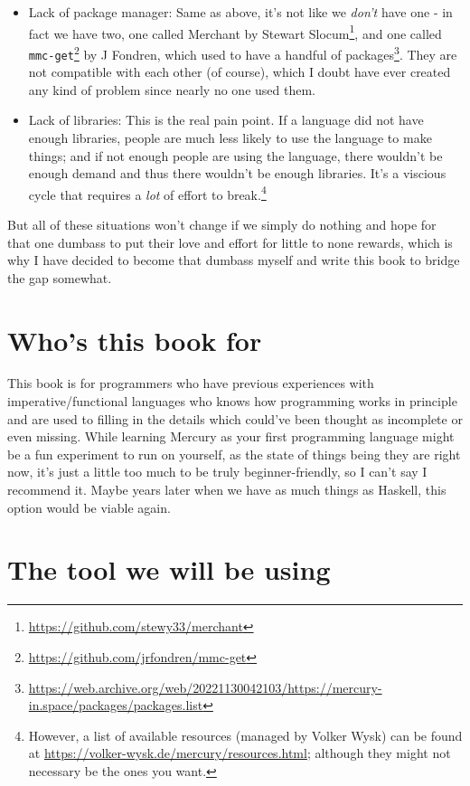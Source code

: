 \begin{itemize}
\begin{itemize}
    \end{itemize}
\item Lack of package manager: Same as above, it's not like we \textit{don't} have one - in fact we have two, one called Merchant by Stewart Slocum\footnote{\url{https://github.com/stewy33/merchant}}, and one called \texttt{mmc-get}\footnote{\url{https://github.com/jrfondren/mmc-get}} by J Fondren, which used to have a handful of packages\footnote{\url{https://web.archive.org/web/20221130042103/https://mercury-in.space/packages/packages.list}}. They are not compatible with each other (of course), which I doubt have ever created any kind of problem since nearly no one used them. 
\item Lack of libraries: This is the real pain point. If a language did not have enough libraries, people are much less likely to use the language to make things; and if not enough people are using the language, there wouldn't be enough demand and thus there wouldn't be enough libraries. It's a viscious cycle that requires a \textit{lot} of effort to break.\footnote{However, a list of available resources (managed by Volker Wysk) can be found at \url{https://volker-wysk.de/mercury/resources.html}; although they might not necessary be the ones you want.}
  
\end{itemize}

But all of these situations won't change if we simply do nothing and hope for that one dumbass to put their love and effort for little to none rewards, which is why I have decided to become that dumbass myself and write this book to bridge the gap somewhat.

\section{Who's this book for}

This book is for programmers who have previous experiences with imperative/functional languages who knows how programming works in principle and are used to filling in the details which could've been thought as incomplete or even missing. While learning Mercury as your first programming language might be a fun experiment to run on yourself, as the state of things being they are right now, it's just a little too much to be truly beginner-friendly, so I can't say I recommend it. Maybe years later when we have as much things as Haskell, this option would be viable again.

\section{The tool we will be using}

